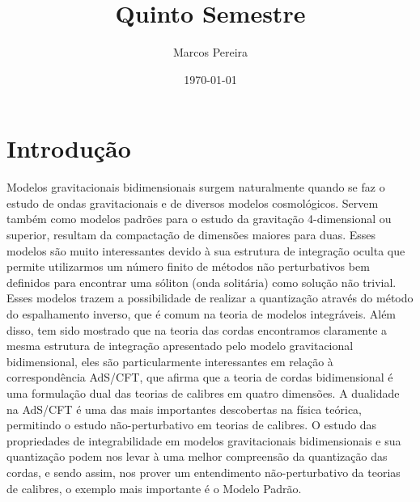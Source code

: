 \documentclass[25pt]{article}
\title{Quinto Semestre}
\author{Marcos Pereira}
\date{\today}
\numberwithin{equation}{subsection} %
\begin{document}
\maketitle
\pagebreak
\tableofcontents

\pagebreak

\section{Introdução}

Modelos gravitacionais bidimensionais surgem naturalmente quando se faz o estudo de ondas gravitacionais e de diversos modelos cosmológicos. Servem também como modelos padrões para o estudo da gravitação 4-dimensional ou superior, resultam da compactação de dimensões maiores para duas. Esses modelos são muito interessantes devido à sua estrutura de integração oculta que permite utilizarmos um número finito de métodos não perturbativos bem definidos para encontrar uma sóliton (onda solitária) como solução não trivial. Esses modelos trazem a possibilidade de realizar a quantização através do método do espalhamento inverso, que é comum na teoria de modelos integráveis. Além disso, tem sido mostrado que na teoria das cordas encontramos claramente a mesma estrutura de integração apresentado pelo modelo gravitacional bidimensional, eles são particularmente interessantes em relação à correspondência AdS/CFT, que afirma que a teoria de cordas bidimensional é uma formulação dual das teorias de calibres em quatro dimensões. A dualidade na AdS/CFT é uma das mais importantes descobertas na física teórica, permitindo o estudo não-perturbativo em teorias de calibres. O estudo das propriedades de integrabilidade em modelos gravitacionais bidimensionais e sua quantização podem nos levar à uma melhor compreensão da quantização das cordas, e sendo assim, nos prover um entendimento não-perturbativo da teorias de calibres, o exemplo mais importante é o Modelo Padrão.
\end{document}
